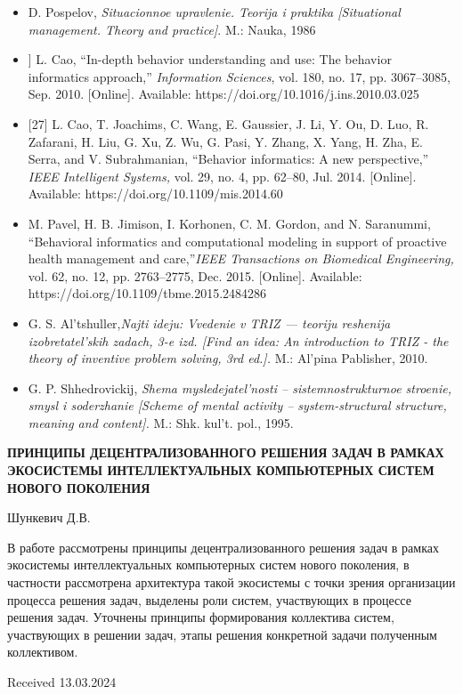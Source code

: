 \begin{multicols}{2}
\begin{itemize}
\renewcommand{\labelitemi}{[25]}
\item D. Pospelov,\textit {  Situacionnoe upravlenie. Teorija i praktika
[Situational management. Theory and practice]}. M.: Nauka,
1986
\renewcommand{\labelitemi}{[26]}
\item
] L. Cao, “In-depth behavior understanding and use: The
behavior informatics approach,”\textit {  Information Sciences}, vol.
180, no. 17, pp. 3067–3085, Sep. 2010. [Online]. Available:
https://doi.org/10.1016/j.ins.2010.03.025
\renewcommand{\labelitemi}{[27]}
\item
{[27]} L. Cao, T. Joachims, C. Wang, E. Gaussier, J. Li, Y. Ou,
D. Luo, R. Zafarani, H. Liu, G. Xu, Z. Wu, G. Pasi, Y. Zhang,
X. Yang, H. Zha, E. Serra, and V. Subrahmanian, “Behavior
informatics: A new perspective,”\textit { IEEE Intelligent Systems,}
vol. 29, no. 4, pp. 62–80, Jul. 2014. [Online]. Available:
https://doi.org/10.1109/mis.2014.60
\renewcommand{\labelitemi}{[28]}
\item
M. Pavel, H. B. Jimison, I. Korhonen, C. M. Gordon, and
N. Saranummi, “Behavioral informatics and computational
modeling in support of proactive health management and
care,”\textit {IEEE Transactions on Biomedical Engineering,} vol. 62,
no. 12, pp. 2763–2775, Dec. 2015. [Online]. Available:
https://doi.org/10.1109/tbme.2015.2484286
\renewcommand{\labelitemi}{[29]}
\item
G. S. Al’tshuller,\textit {Najti ideju: Vvedenie v TRIZ — teoriju reshenija
izobretatel’skih zadach, 3-e izd. [Find an idea: An introduction
to TRIZ - the theory of inventive problem solving, 3rd ed.].} M.:
Al’pina Pablisher, 2010.
\renewcommand{\labelitemi}{[30]}
\item G. P. Shhedrovickij,\textit { Shema mysledejatel’nosti – sistemnostrukturnoe stroenie, smysl i soderzhanie [Scheme of mental
activity – system-structural structure, meaning and content].} M.:
Shk. kul’t. pol., 1995.
\end{itemize}
\columnbreak
\begin{center}
\begin{onehalfspace}
 \textbf{\Large{ПРИНЦИПЫ
ДЕЦЕНТРАЛИЗОВАННОГО РЕШЕНИЯ
ЗАДАЧ В РАМКАХ ЭКОСИСТЕМЫ
ИНТЕЛЛЕКТУАЛЬНЫХ
КОМПЬЮТЕРНЫХ СИСТЕМ НОВОГО
    ПОКОЛЕНИЯ }}
\end{onehalfspace}
 \end{center}
 \setlength{\parskip}{10pt}
\begin{center}
\textup{\Large{Шункевич Д.В.}}\\
 \end{center}
 \large {В работе рассмотрены принципы децентрализованного решения задач в рамках экосистемы интеллектуальных компьютерных систем нового поколения, в
частности рассмотрена архитектура такой экосистемы
с точки зрения организации процесса решения задач,
выделены роли систем, участвующих в процессе решения задач. Уточнены принципы формирования коллектива систем, участвующих в решении задач, этапы
решения конкретной задачи полученным коллективом.}
\parskip=4pt
\begin{flushright}
\setlength{\parskip}{10pt}
    Received 13.03.2024
\end{flushright}
\end{multicols}
\newpage

